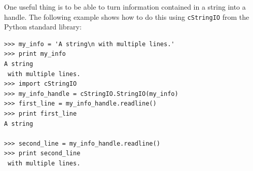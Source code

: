 \documentclass{report}
\begin{document}
One useful thing is to be able to turn information contained in a
string into a handle. The following example shows how to do this using
\verb|cStringIO| from the Python standard library:

\begin{verbatim}
>>> my_info = 'A string\n with multiple lines.'
>>> print my_info
A string
 with multiple lines.
>>> import cStringIO
>>> my_info_handle = cStringIO.StringIO(my_info)
>>> first_line = my_info_handle.readline()
>>> print first_line
A string

>>> second_line = my_info_handle.readline()
>>> print second_line
 with multiple lines.
\end{verbatim}
\end{document}
